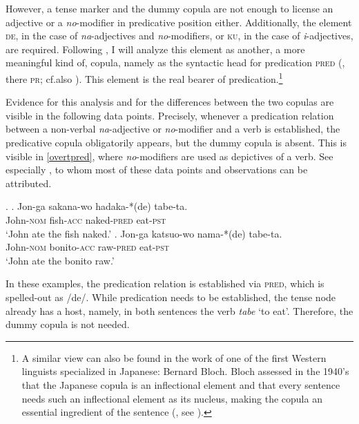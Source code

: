 \documentclass [output=book,colorlinks,citecolor=brown]{langscibook}
\begin{document}
However, a tense marker and the dummy copula are not enough to license an adjective or a \textit{no}-modifier in predicative position either. Additionally, the element \textsc{de}, in the case of \textit{na}-adjectives and \textit{no}-modifiers, or \textsc{ku}, in the case of \textit{i}-adjectives, are required. Following \citet{nishiyama:1999:adj}, I will analyze this element as another, a more meaningful kind of, copula, namely as the syntactic head for predication \textsc{pred} (\citealt{bowers:1993:predication}, there \textsc{pr}; cf.also \citealt{svenonius:1996:pred, bowers:2002:pred, dikken:2006:relators, heycock:2013:syntax}). This element is the real bearer of predication.\footnote{A similar view can also be found in the work of one of the first Western linguists specialized in Japanese: Bernard Bloch. Bloch assessed in the 1940's that the Japanese copula is an inflectional element and that every sentence needs such an inflectional element as its nucleus, making the copula an essential ingredient of the sentence (\citealt[35]{bloch:1970:bloch}, see \citealt[187–188]{nishiyama:1999:adj}).} %

Evidence for this analysis and for the differences between the two copulas are visible in the following data points. Precisely, whenever a predication relation between a non-verbal \textit{na}-adjective or \textit{no}-modifier and a verb is established, the predicative copula obligatorily appears, but the dummy copula is absent. This is visible in \ref{overtpred}, where \textit{no}-modifiers are used as depictives of a verb. See especially \citet{koizumi:1995:secondary}, to whom most of these data points and observations can be attributed. %


\ex. \label{overtpred} \ag. Jon-ga sakana-wo hadaka-*(de) tabe-ta.\\
John-\textsc{nom} fish-\textsc{acc} naked-\textsc{pred} eat-\textsc{pst}\\
`John ate the fish naked.' \null\hfill \citep[188]{nishiyama:1999:adj}
\bg. Jon-ga katsuo-wo nama-*(de) tabe-ta.\\
John-\textsc{nom} bonito-\textsc{acc} raw-\textsc{pred} eat-\textsc{pst}\\
`John ate the bonito raw.' \null \hfill \citep[27]{koizumi:1995:secondary}

In these examples, the predication relation is established via \textsc{pred}, which is spelled-out as /de/. While predication needs to be established, the tense node already has a host, namely, in both sentences the verb \textit{tabe} `to eat’. Therefore, the dummy copula is not needed. %
\end{document}
